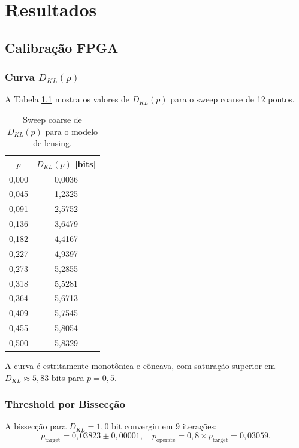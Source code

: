 \documentclass[12pt,a4paper,oneside]{book}
\theoremstyle{definition}
\theoremstyle{remark}
\begin{document}
\chapter{Resultados}\label{chap:resultados}

\section{Calibração FPGA}

\subsection{Curva $D_{KL}(p)$}

A Tabela \ref{tab:kl_curve} mostra os valores de $D_{KL}(p)$ para o sweep coarse de 12 pontos.

\begin{table}[H]
\centering
\caption{Sweep coarse de $D_{KL}(p)$ para o modelo de lensing.}\label{tab:kl_curve}
\begin{tabular}{c|c}
\toprule
$p$ & $D_{KL}(p)$ [bits] \\
\midrule
0{,}000 & 0{,}0036 \\
0{,}045 & 1{,}2325 \\
0{,}091 & 2{,}5752 \\
0{,}136 & 3{,}6479 \\
0{,}182 & 4{,}4167 \\
0{,}227 & 4{,}9397 \\
0{,}273 & 5{,}2855 \\
0{,}318 & 5{,}5281 \\
0{,}364 & 5{,}6713 \\
0{,}409 & 5{,}7545 \\
0{,}455 & 5{,}8054 \\
0{,}500 & 5{,}8329 \\
\bottomrule
\end{tabular}
\end{table}

A curva é estritamente monotônica e côncava, com saturação superior em $D_{KL} \approx 5{,}83$ bits para $p = 0{,}5$.

\subsection{Threshold por Bissecção}

A bissecção para $D_{KL} = 1{,}0$ bit convergiu em 9 iterações:
\begin{equation}
    p_{\text{target}} = 0{,}03823 \pm 0{,}00001, \quad p_{\text{operate}} = 0{,}8 \times p_{\text{target}} = 0{,}03059.
\end{equation}
\end{document}
